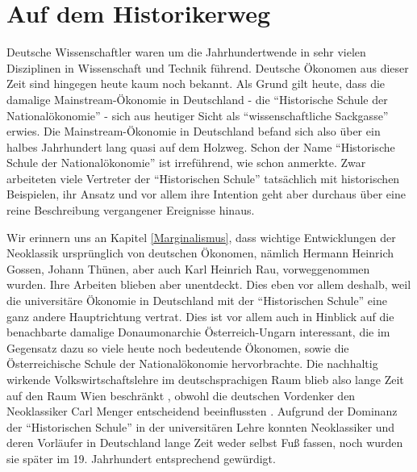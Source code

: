 %
%
%

\chapter{Auf dem Historikerweg}
\label{Historisch}

Deutsche Wissenschaftler waren um die Jahrhundertwende in sehr vielen Disziplinen in Wissenschaft und Technik führend. Deutsche Ökonomen aus dieser Zeit sind hingegen heute kaum noch bekannt. Als Grund gilt heute, dass die damalige Mainstream-Ökonomie in Deutschland - die "`Historische Schule der Nationalökonomie"' - sich aus heutiger Sicht als "`wissenschaftliche Sackgasse"' \parencite[S. 229]{Rosner2012} erwies. Die Mainstream-Ökonomie in Deutschland befand sich also über ein halbes Jahrhundert lang quasi auf dem Holzweg. Schon der Name "`Historische Schule der Nationalökonomie"' ist irreführend, wie schon \textcite[S. 775]{Schumpeter1954} anmerkte. Zwar arbeiteten viele Vertreter der "`Historischen Schule"' tatsächlich mit historischen Beispielen, ihr Ansatz und vor allem ihre Intention geht aber durchaus über eine reine Beschreibung vergangener Ereignisse hinaus. 

Wir erinnern uns an Kapitel \ref{Marginalismus}, dass wichtige Entwicklungen der Neoklassik ursprünglich von deutschen Ökonomen, nämlich Hermann Heinrich Gossen, Johann Thünen, aber auch Karl Heinrich Rau, vorweggenommen wurden. Ihre Arbeiten blieben aber unentdeckt. Dies eben vor allem deshalb, weil die universitäre Ökonomie in Deutschland mit der "`Historischen Schule"' eine ganz andere Hauptrichtung vertrat. Dies ist vor allem auch in Hinblick auf die benachbarte damalige Donaumonarchie Österreich-Ungarn interessant, die im Gegensatz dazu so viele heute noch bedeutende Ökonomen, sowie die Österreichische Schule der Nationalökonomie hervorbrachte. Die nachhaltig wirkende Volkswirtschaftslehre im deutschsprachigen Raum blieb also lange Zeit auf den Raum Wien beschränkt \parencite[S. 339]{Rosner2012}, obwohl die deutschen Vordenker den Neoklassiker Carl Menger entscheidend beeinflussten \parencite{Streissler1990}. Aufgrund der Dominanz der "`Historischen Schule"' in der universitären Lehre konnten Neoklassiker und deren Vorläufer in Deutschland lange Zeit weder selbst Fuß fassen, noch wurden sie später im 19. Jahrhundert entsprechend gewürdigt.


